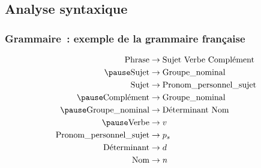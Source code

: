 \subsection{Analyse syntaxique}
\begin{frame}[fragile]
    \frametitle{Grammaire~: exemple de la grammaire française}

    \[
        \begin{aligned}
            \text{Phrase}                   & \to \text{Sujet Verbe Complément}   \\
            \pause
            \text{Sujet}                    & \to \text{Groupe\_nominal}          \\
            \text{Sujet}                    & \to \text{Pronom\_personnel\_sujet} \\
            \pause
            \text{Complément}               & \to \text{Groupe\_nominal}          \\
            \pause
            \text{Groupe\_nominal}          & \to \text{Déterminant Nom}          \\
            \pause
            \text{Verbe}                    & \to v                               \\
            \text{Pronom\_personnel\_sujet} & \to p_s                             \\
            \text{Déterminant}              & \to d                               \\
            \text{Nom}                      & \to n                               \\
        \end{aligned}
    \]
\end{frame}

